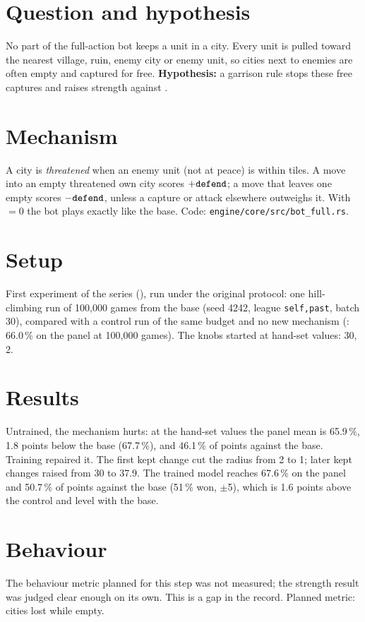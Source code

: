\documentclass{../polyexp}
\begin{document}

\ExpHeader

\section{Question and hypothesis}
No part of the full-action bot keeps a unit in a city. Every unit is pulled toward the nearest village, ruin, enemy city or enemy unit, so cities next to enemies are often empty and captured for free. \textbf{Hypothesis:} a garrison rule stops these free captures and raises strength against .

\section{Mechanism}
A city is \emph{threatened} when an enemy unit (not at peace) is within  tiles. A move into an empty threatened own city scores $+\texttt{defend}$; a move that leaves one empty scores $-\texttt{defend}$, unless a capture or attack elsewhere outweighs it. With  $=0$ the bot plays exactly like the base. Code: \texttt{engine/core/src/bot\_full.rs}.

\section{Setup}
First experiment of the series (), run under the original protocol: one hill-climbing run of 100,000 games from the base (seed 4242, league \texttt{self,past}, batch 30), compared with a control run of the same budget and no new mechanism (: 66.0\,\% on the panel at 100,000 games). The knobs started at hand-set values:  30,  2.

\section{Results}
\ExpResults

Untrained, the mechanism hurts: at the hand-set values the panel mean is 65.9\,\%, 1.8 points below the base (67.7\,\%), and 46.1\,\% of points against the base. Training repaired it. The first kept change cut the radius from 2 to 1; later kept changes raised  from 30 to 37.9. The trained model reaches 67.6\,\% on the panel and 50.7\,\% of points against the base (51\,\% won, $\pm$5), which is 1.6 points above the control and level with the base.

\section{Behaviour}
The behaviour metric planned for this step was not measured; the strength result was judged clear enough on its own. This is a gap in the record. Planned metric: cities lost while empty.
\end{document}
